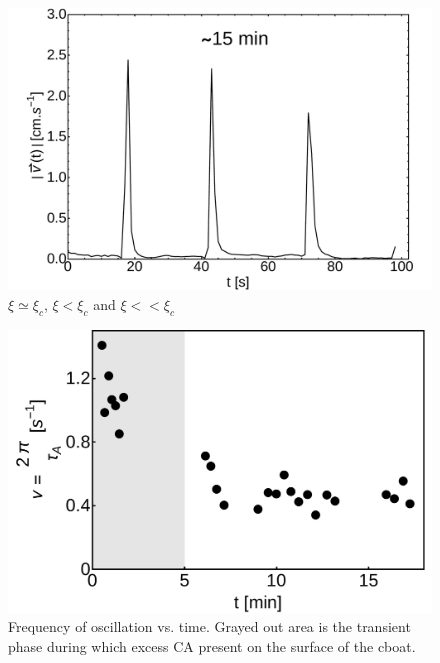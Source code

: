 \documentclass[journal=langd5, manuscript=article, layout=onecolumn]{achemso}
\begin{document}
\begin{figure}[ht]
\begin{minipage}[c]{0.3\linewidth}
	\end{minipage}
	\begin{minipage}[c]{0.3\linewidth}
		\centering
		\includegraphics[width=\textwidth]{uvst_65dypcm_c.pdf}
	\end{minipage}
	\caption{$\xi \simeq \xi_{c}$, $\xi < \xi_{c}$ and $\xi << \xi_{c}$}\label{fig:uvst_65dypcm}
\end{figure}
\begin{figure}[ht] 
    \begin{center}
       \includegraphics[scale=0.4]{freqvst.pdf}
    \end{center}
    \caption{Frequency of oscillation vs. time. Grayed out area is the transient phase during which excess CA present on the surface of the cboat.}
    \label{fig:freqvst}
\end{figure}
\end{document}
